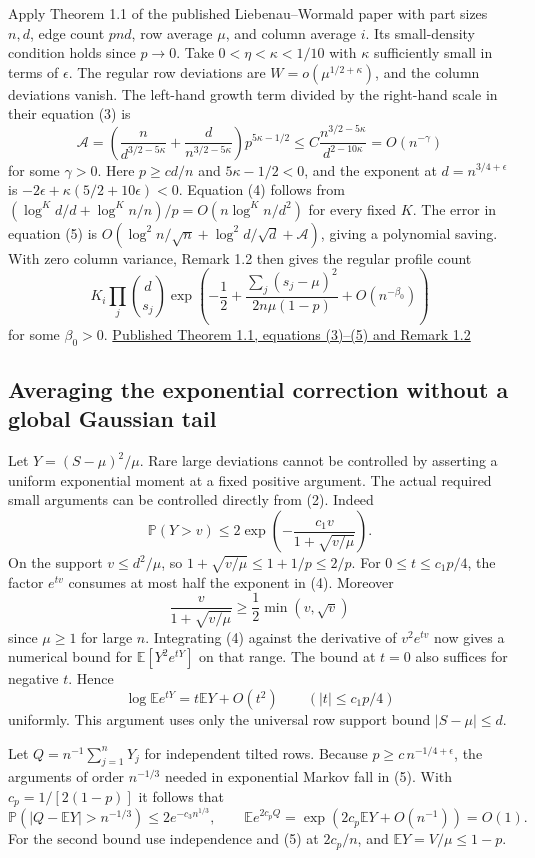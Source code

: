 \documentclass[11pt]{article}
\begin{document}
Apply Theorem 1.1 of the published Liebenau--Wormald paper \cite{LW} with
part sizes $n,d$, edge count $pnd$, row average $\mu$, and column
average $i$. Its small-density condition holds since $p\to0$.
Take $0<\eta<\kappa<1/10$ with $\kappa$ sufficiently small in
terms of $\epsilon$. The regular row deviations are
$W=o(\mu^{1/2+\kappa})$, and the column deviations vanish.
The left-hand growth term divided by the right-hand scale in
their equation (3) is
\[
\mathcal A=
\left(\frac{n}{d^{3/2-5\kappa}}+\frac{d}{n^{3/2-5\kappa}}\right)
p^{5\kappa-1/2}
\le C\frac{n^{3/2-5\kappa}}{d^{2-10\kappa}}
=O(n^{-\gamma})
\]
for some $\gamma>0$. Here $p\ge cd/n$ and $5\kappa-1/2<0$,
and the exponent at $d=n^{3/4+\epsilon}$ is
$-2\epsilon+\kappa(5/2+10\epsilon)<0$. Equation (4) follows
from $(\log^K d/d+\log^K n/n)/p=O(n\log^K n/d^2)$ for every
fixed $K$. The error in equation (5) is
$O(\log^2 n/\sqrt n+\log^2 d/\sqrt d+\mathcal A)$, giving a
polynomial saving. With zero column variance, Remark 1.2
then gives the regular profile count
\[
K_i\prod_j\binom d{s_j}
\exp\left(-\frac12+\frac{\sum_j(s_j-\mu)^2}{2n\mu(1-p)}
+O(n^{-\beta_0})\right)
\tag{3}
\]
for some $\beta_0>0$. \href{https://onlinelibrary.wiley.com/doi/full/10.1002/rsa.21105\#rsa21105-mthst-0001}{Published Theorem 1.1, equations (3)--(5) and Remark 1.2}

\subsection{Averaging the exponential correction without a global Gaussian tail}

Let $Y=(S-\mu)^2/\mu$. Rare large deviations cannot be controlled
by asserting a uniform exponential moment at a fixed positive
argument. The actual required small arguments can be controlled
directly from (2). Indeed
\[
\mathbb P(Y>v)\le 2\exp\left(-\frac{c_1v}{1+\sqrt{v/\mu}}\right).
\tag{4}
\]
On the support $v\le d^2/\mu$, so
$1+\sqrt{v/\mu}\le1+1/p\le2/p$. For $0\le t\le c_1p/4$, the factor
$e^{tv}$ consumes at most half the exponent in (4). Moreover
\[
\frac{v}{1+\sqrt{v/\mu}}\ge \frac12\min(v,\sqrt v)
\]
since $\mu\ge1$ for large $n$. Integrating (4) against the derivative
of $v^2 e^{tv}$ now gives a numerical bound for
$\mathbb E[Y^2 e^{tY}]$ on that range. The bound at $t=0$ also suffices
for negative $t$. Hence
\[
\log\mathbb E e^{tY}=t\mathbb E Y+O(t^2)
\qquad (|t|\le c_1p/4)
\tag{5}
\]
uniformly. This argument uses only the universal row support bound
$|S-\mu|\le d$.

Let $Q=n^{-1}\sum_{j=1}^nY_j$ for independent tilted rows.
Because $p\ge c\,n^{-1/4+\epsilon}$, the arguments of order
$n^{-1/3}$ needed in exponential Markov fall in (5). With
$c_p=1/[2(1-p)]$ it follows that
\[
\mathbb P(|Q-\mathbb EY|>n^{-1/3})\le2e^{-c_3 n^{1/3}},
\qquad
\mathbb E e^{2c_p Q}=\exp(2c_p \mathbb E Y+O(n^{-1}))=O(1).
\]
For the second bound use independence and (5) at $2c_p/n$,
and $\mathbb E Y=V/\mu\le1-p$.
\end{document}
